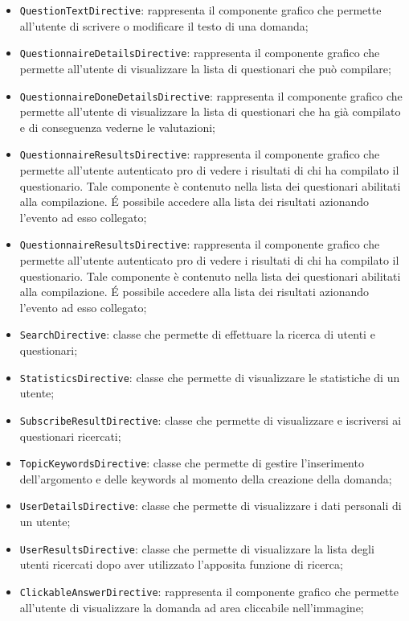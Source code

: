 \begin{itemize}
\begin{itemize}
		\item \texttt{QuestionTextDirective}: rappresenta il componente grafico che permette all'utente di scrivere o modificare il testo di una domanda;
		\item \texttt{QuestionnaireDetailsDirective}: rappresenta il componente grafico che permette all'utente di visualizzare la lista di questionari che può compilare;
		\item \texttt{QuestionnaireDoneDetailsDirective}: rappresenta il componente grafico che permette all'utente di visualizzare la lista di questionari che ha già compilato e di conseguenza vederne le valutazioni;
		\item \texttt{QuestionnaireResultsDirective}: rappresenta il componente grafico che permette all'utente autenticato pro di vedere i risultati di chi ha compilato il questionario. Tale componente è contenuto nella lista dei questionari abilitati alla compilazione. É possibile accedere alla lista dei risultati azionando l'evento ad esso collegato;
		\item \texttt{QuestionnaireResultsDirective}: rappresenta il componente grafico che permette all'utente autenticato pro di vedere i risultati di chi ha compilato il questionario. Tale componente è contenuto nella lista dei questionari abilitati alla compilazione. É possibile accedere alla lista dei risultati azionando l'evento ad esso collegato;
		\item \texttt{SearchDirective}: classe che permette di effettuare la ricerca di utenti e questionari;
		\item \texttt{StatisticsDirective}: classe che permette di visualizzare le statistiche di un utente;
		\item \texttt{SubscribeResultDirective}: classe che permette di visualizzare e iscriversi ai questionari ricercati;
		\item \texttt{TopicKeywordsDirective}: classe che permette di gestire l'inserimento dell'argomento e delle	keywords al momento della creazione della domanda;
		\item \texttt{UserDetailsDirective}: classe che permette di visualizzare i dati personali di un utente;
		\item \texttt{UserResultsDirective}: classe che permette di visualizzare la lista degli utenti ricercati dopo aver utilizzato l'apposita funzione di ricerca;
		\item \texttt{ClickableAnswerDirective}: rappresenta il componente grafico che permette all'utente di visualizzare la domanda ad area cliccabile nell'immagine;

\end{itemize}
\end{itemize}
